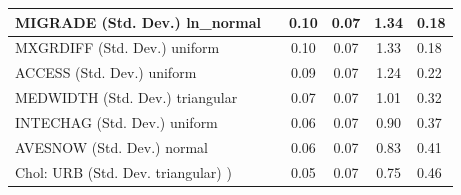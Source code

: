 \begin{table}
\begin{center}
\begin{tabular}{|l|l|c|c|c|l|}
			\hline
			MIGRADE (Std. Dev.) ln_normal &  & 0.10 & 0.07 & 1.34 & 0.18 \\
			\hline
			MXGRDIFF (Std. Dev.) uniform &  & 0.10 & 0.07 & 1.33 & 0.18 \\
			\hline
			ACCESS (Std. Dev.) uniform &  & 0.09 & 0.07 & 1.24 & 0.22 \\
			\hline
			MEDWIDTH (Std. Dev.) triangular &  & 0.07 & 0.07 & 1.01 & 0.32 \\
			\hline
			INTECHAG (Std. Dev.) uniform &  & 0.06 & 0.07 & 0.90 & 0.37 \\
			\hline
			AVESNOW (Std. Dev.) normal &  & 0.06 & 0.07 & 0.83 & 0.41 \\
			\hline
			 Chol: URB (Std. Dev. triangular) ) &  & 0.05 & 0.07 & 0.75 & 0.46 \\
			\hline
		\end{tabular}
	\end{center}
\end{table}